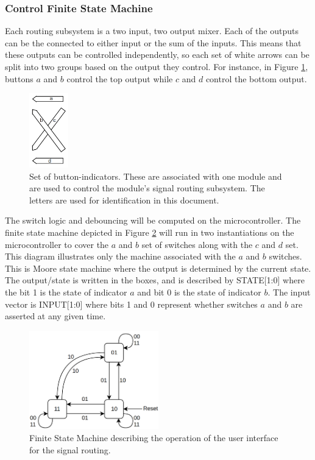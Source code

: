 \documentclass{article}
\begin{document}
	\subsubsection{Control Finite State Machine}

	Each routing subsystem is a two input, two output mixer.  Each of the outputs can be the connected to either input or the sum of the inputs.  This means that these outputs can be controlled independently, so each set of white arrows can be split into two groups based on the output they control.  For instance, in Figure \ref{fig:UIarrowlabels}, buttons $a$ and $b$ control the top output while $c$ and $d$ control the bottom output.

	\begin{figure}
		\centering
		\includegraphics[width = 0.15\textwidth]{PR4Images/UIarrowlabels.png}
		\caption{Set of button-indicators.  These are associated with one module and are used to control the module's signal routing subsystem.  The letters are used for identification in this document.}
		\label{fig:UIarrowlabels}
	\end{figure}

	The switch logic and debouncing will be computed on the microcontroller.  The finite state machine depicted in Figure \ref{fig:UIFSM} will run in two instantiations on the microcontroller to cover the $a$ and $b$ set of switches along with the $c$ and $d$ set.  This diagram illustrates only the machine associated with the $a$ and $b$ switches.  This is Moore state machine where the output is determined by the current state.  The output/state is written in the boxes, and is described by STATE[1:0] where the bit 1 is the state of indicator $a$ and bit 0 is the state of indicator $b$.  The input vector is INPUT[1:0] where bits 1 and 0 represent whether switches $a$ and $b$ are asserted at any given time.

	\begin{figure}
		\centering
		\includegraphics[width = 0.5\textwidth]{PR4Images/UIFSM.png}
		\caption{Finite State Machine describing the operation of the user interface for the signal routing.}
		\label{fig:UIFSM}
	\end{figure}
\end{document}
